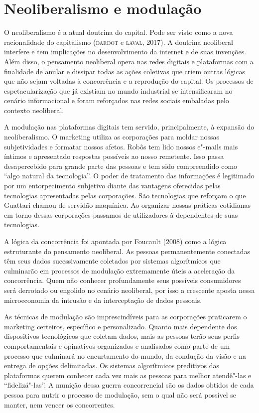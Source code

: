 \section{Neoliberalismo e modulação}

\noindent{}O neoliberalismo é a atual doutrina do capital. Pode ser visto como a
nova racionalidade do capitalismo (\textsc{dardot} e \textsc{laval}, 2017). A doutrina
neoliberal interfere e tem implicações no desenvolvimento da internet e
de suas invenções. Além disso, o pensamento neoliberal opera nas redes
digitais e plataformas com a finalidade de anular e dissipar todas as
ações coletivas que criem outras lógicas que não sejam voltadas à
concorrência e a reprodução do capital. Os processos de
espetacularização que já existiam no mundo industrial se intensificaram
no cenário informacional e foram reforçados nas redes sociais embaladas
pelo contexto neoliberal.

A modulação nas plataformas digitais tem servido, principalmente, à
expansão do neoliberalismo. O marketing utiliza as corporações para
moldar nossas subjetividades e formatar nossos afetos. Robôs tem lido
nossos e"-mails mais íntimos e apresentado respostas possíveis ao nosso
remetente. Isso passa desapercebido para grande parte das pessoas e tem
sido compreendido como ``algo natural da tecnologia''. O poder de
tratamento das informações é legitimado por um entorpecimento subjetivo
diante das vantagens oferecidas pelas tecnologias apresentadas pelas
corporações. São tecnologias que reforçam o que Guattari chamou de
servidão maquínica. Ao organizar nossas práticas cotidianas em torno
dessas corporações passamos de utilizadores à dependentes de suas
tecnologias.

A lógica da concorrência foi apontada por Foucault (2008) como a lógica
estruturante do pensamento neoliberal. As pessoas permanentemente
conectadas têm seus dados sucessivamente coletados por sistemas
algorítmicos que culminarão em processos de modulação extremamente úteis
a aceleração da concorrência. Quem não conhecer profundamente seus
possíveis consumidores será derrotado ou engolido no cenário neoliberal,
por isso a crescente aposta nessa microeconomia da intrusão e da
interceptação de dados pessoais.

As técnicas de modulação são imprescindíveis para as corporações
praticarem o marketing certeiros, específico e personalizado. Quanto
mais dependente dos dispositivos tecnológicos que coletam dados, mais as
pessoas terão seus perfis comportamentais e opinativos organizados e
analisados como parte de um processo que culminará no encurtamento do
mundo, da condução da visão e na entrega de opções delimitadas. Os
sistemas algorítmicos preditivos das plataformas querem conhecer cada
vez mais as pessoas para melhor atendê"-las e ``fidelizá"-las''. A munição
dessa guerra concorrencial são os dados obtidos de cada pessoa para
nutrir o processo de modulação, sem o qual não será possível se manter,
nem vencer os concorrentes.

